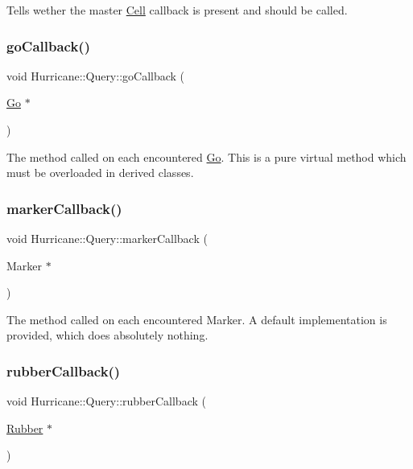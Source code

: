 Tells wether the master \mbox{\hyperlink{classHurricane_1_1Cell}{Cell}} callback is present and should be called. \mbox{\label{classHurricane_1_1Query_a59007148bd0afa0405801f341e7e4139}} 
\subsubsection{\texorpdfstring{go\+Callback()}{goCallback()}}
{\footnotesize\ttfamily void Hurricane\+::\+Query\+::go\+Callback (\begin{DoxyParamCaption}\item[{\mbox{\hyperlink{classHurricane_1_1Go}{Go}} $\ast$}]{ }\end{DoxyParamCaption})\hspace{0.3cm}{\ttfamily [pure virtual]}}

The method called on each encountered \mbox{\hyperlink{classHurricane_1_1Go}{Go}}. This is a pure virtual method which must be overloaded in derived classes. \mbox{\label{classHurricane_1_1Query_a4ad5bf076073f107189d4b7ee48f040e}} 
\subsubsection{\texorpdfstring{marker\+Callback()}{markerCallback()}}
{\footnotesize\ttfamily void Hurricane\+::\+Query\+::marker\+Callback (\begin{DoxyParamCaption}\item[{Marker $\ast$}]{ }\end{DoxyParamCaption})\hspace{0.3cm}{\ttfamily [virtual]}}

The method called on each encountered Marker. A default implementation is provided, which does absolutely nothing. \mbox{\label{classHurricane_1_1Query_acec322581e35c1556ce706aa5ea66aa3}} 
\subsubsection{\texorpdfstring{rubber\+Callback()}{rubberCallback()}}
{\footnotesize\ttfamily void Hurricane\+::\+Query\+::rubber\+Callback (\begin{DoxyParamCaption}\item[{\mbox{\hyperlink{classHurricane_1_1Rubber}{Rubber}} $\ast$}]{ }\end{DoxyParamCaption})\hspace{0.3cm}{\ttfamily [virtual]}}

